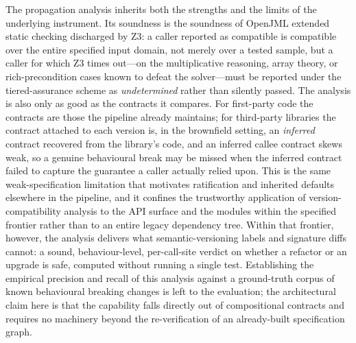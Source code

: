 The propagation analysis inherits both the strengths and the limits of the
underlying instrument. Its soundness is the soundness of OpenJML extended static
checking discharged by Z3: a caller reported as compatible is compatible over the
entire specified input domain, not merely over a tested sample, but a caller for
which Z3 times out---on the multiplicative reasoning, array theory, or
rich-precondition cases known to defeat the solver---must be reported under the
tiered-assurance scheme as \emph{undetermined} rather than silently passed. The
analysis is also only as good as the contracts it compares. For first-party code
the contracts are those the pipeline already maintains; for third-party libraries
the contract attached to each version is, in the brownfield setting, an
\emph{inferred} contract recovered from the library's code, and an inferred
callee contract skews weak, so a genuine behavioural break may be missed when the
inferred contract failed to capture the guarantee a caller actually relied upon.
This is the same weak-specification limitation that motivates ratification and
inherited defaults elsewhere in the pipeline, and it confines the trustworthy
application of version-compatibility analysis to the API surface and the modules
within the specified frontier rather than to an entire legacy dependency tree.
Within that frontier, however, the analysis delivers what semantic-versioning
labels and signature diffs cannot: a sound, behaviour-level, per-call-site verdict
on whether a refactor or an upgrade is safe, computed without running a single
test. Establishing the empirical precision and recall of this analysis against a
ground-truth corpus of known behavioural breaking changes is left to the
evaluation; the architectural claim here is that the capability falls directly
out of compositional contracts and requires no machinery beyond the
re-verification of an already-built specification graph.
